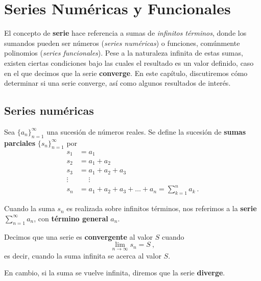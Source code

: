 \chapter{Series Numéricas y Funcionales}

El concepto de \textbf{serie} hace referencia a sumas de \emph{infinitos términos}, donde los sumandos pueden ser números (\emph{series numéricas}) o funciones, comúnmente polinomios (\emph{series funcionales}). Pese a la naturaleza infinita de estas sumas, existen ciertas condiciones bajo las cuales el resultado es un valor definido, caso en el que decimos que la serie \textbf{converge}. En este capítulo, discutiremos cómo determinar si una serie converge, así como algunos resultados de interés.

\section{Series numéricas}

\begin{defi}
    Sea $\{ a_n \}_{n=1}^\infty$ una sucesión de números reales. Se define la sucesión de \textbf{sumas parciales} $\{s_n\}_{n=1}^\infty$ por 
    \begin{align*}
        s_1 & = a_1 \\
        s_2 & = a_1 + a_2 \\
        s_3 & = a_1 + a_2 + a_3 \\
        \vdots & \phantom{=} \vdots \\
        s_n & = a_1 + a_2 + a_3 + \dots + a_n  = \sum_{k=1}^n a_k \ .
    \end{align*}

    Cuando la suma $s_n$ es realizada sobre infinitos términos, nos referimos a la \textbf{serie} $\sum\limits_{n=1}^\infty a_n$, con \textbf{término general} $a_n$.
\end{defi}

\begin{defi}
    Decimos que una serie es \textbf{convergente} al valor $S$ cuando
    \begin{equation}
        \lim_{n \to \infty} s_n = S \ ,
    \end{equation}
    es decir, cuando la suma infinita se acerca al valor $S$.

    En cambio, si la suma se vuelve infinita, diremos que la serie \textbf{diverge}.
\end{defi}

